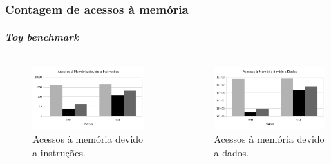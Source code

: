 \documentclass[10pt]{beamer}
\begin{document}
\begin{frame}
\frametitle{Contagem de acessos à memória}
\framesubtitle{\textit{Toy benchmark}}

\begin{columns}

\begin{figure}[h!]
\centering 

\includegraphics[width=0.9\linewidth]{toy_inst}
\caption{Acessos à memória devido a instruções.}
\end{figure}

\begin{figure}[h!]
\centering
\includegraphics[width=0.9\linewidth]{toy_data}
\caption{Acessos à memória devido a dados.}
\end{figure}
\end{columns}
 
\end{frame}
\end{document}

